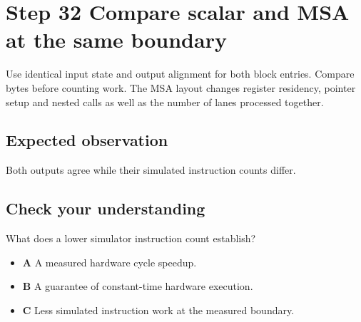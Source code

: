 \section{Step 32 Compare scalar and MSA at the same boundary}\label{chacha-s32}

Use identical input state and output alignment for both block entries. Compare bytes before counting work. The MSA layout changes register residency, pointer setup and nested calls as well as the number of lanes processed together.

\subsection{Expected observation}
Both outputs agree while their simulated instruction counts differ.

\subsection{Check your understanding}
What does a lower simulator instruction count establish?

\begin{itemize}
  \item \textbf{A} A measured hardware cycle speedup.
  \item \textbf{B} A guarantee of constant-time hardware execution.
  \item \textbf{C} Less simulated instruction work at the measured boundary.
\end{itemize}
